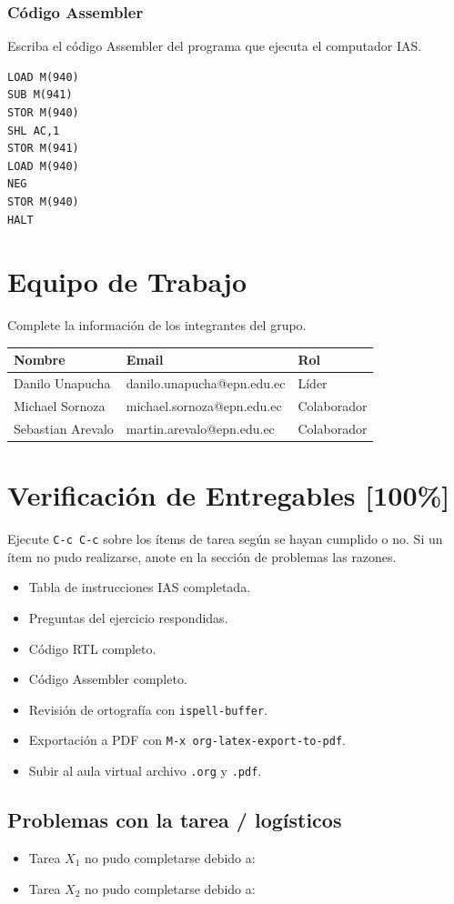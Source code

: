 \documentclass{article}
\begin{document}
\subsubsection{Código Assembler}
\label{sec:org9407f18}

Escriba el código Assembler del programa que ejecuta el computador IAS.

\begin{verbatim}
LOAD M(940)
SUB M(941)
STOR M(940)
SHL AC,1
STOR M(941)
LOAD M(940)
NEG
STOR M(940)
HALT
\end{verbatim}

\section{Equipo de Trabajo}
\label{sec:orga0ec312}

Complete la información de los integrantes del grupo.

\begin{center}
\begin{tabular}{lll}
\hline
Nombre & Email & Rol\\[0pt]
\hline
Danilo Unapucha & danilo.unapucha@epn.edu.ec & Líder\\[0pt]
Michael Sornoza & michael.sornoza@epn.edu.ec & Colaborador\\[0pt]
Sebastian Arevalo & martin.arevalo@epn.edu.ec & Colaborador\\[0pt]
\hline
\end{tabular}
\end{center}

\section{Verificación de Entregables [100\%]}
\label{sec:org5482034}

Ejecute \texttt{C-c C-c} sobre los ítems de tarea según se hayan cumplido o
no. Si un ítem no pudo realizarse, anote en la sección de problemas
las razones.

\begin{itemize}
\item[{$\boxtimes$}] Tabla de instrucciones IAS completada.
\item[{$\boxtimes$}] Preguntas del ejercicio respondidas.
\item[{$\boxtimes$}] Código RTL completo.
\item[{$\boxtimes$}] Código Assembler completo.
\item[{$\boxtimes$}] Revisión de ortografía con \texttt{ispell-buffer}.
\item[{$\boxtimes$}] Exportación a PDF con \texttt{M-x org-latex-export-to-pdf}.
\item[{$\boxtimes$}] Subir al aula virtual archivo \texttt{.org} y \texttt{.pdf}.
\end{itemize}

\subsection{Problemas con la tarea / logísticos}
\label{sec:org5339264}

\begin{itemize}
\item Tarea \(X_1\) no pudo completarse debido a:
\item Tarea \(X_2\) no pudo completarse debido a:
\end{itemize}

\printbibliography
\end{document}
